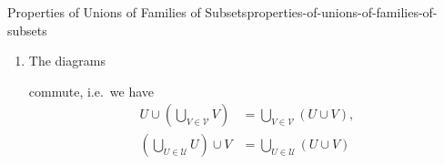 \begin{proposition}{Properties of Unions of Families of Subsets}{properties-of-unions-of-families-of-subsets}
\begin{enumerate}
\[\begin{tikzcd}[row sep={5.0*\the\DL,between origins}, column sep={10.0*\the\DL,between origins}, background color=backgroundColor, ampersand replacement=\&]
                \end{tikzcd}
            \]%
            commutes, i.e.\ we have
            \[
                \bigcup_{W\in\mathcal{U}\cup\mathcal{V}}W%
                =%
                \left(\bigcup_{U\in\mathcal{U}}U\right)%
                \cup
                \left(\bigcup_{V\in\mathcal{V}}V\right)%
            \]%
            for each $\mathcal{U},\mathcal{V}\in\mathcal{P}(\mathcal{P}(X))$.
        \item\label{properties-of-unions-of-families-of-subsets-interaction-with-unions-2}The diagrams
            \begin{scalemath}
                \quad
            \end{scalemath}
            commute, i.e.\ we have
            \begin{align*}
                U\cup\left(\bigcup_{V\in\mathcal{V}}V\right)  &= \bigcup_{V\in\mathcal{V}}(U\cup V),\\%
                \left(\bigcup_{U\in\mathcal{U}}U\right)\cup V &= \bigcup_{U\in\mathcal{U}}(U\cup V)%

\end{align*}
\end{enumerate}
\end{proposition}
